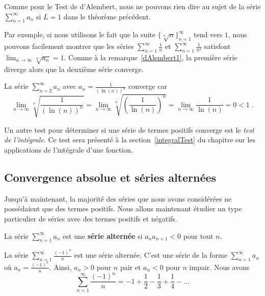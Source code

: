 {\begin{rmk}
Comme pour le Test de d'Alembert, nous ne pouvons rien dire au sujet
de la série
$\displaystyle \sum_{n=1}^\infty a_n$ si $L=1$ dans le théorème précédent. 

Par exemple, si nous utilisons le fait que la suite
$\{ \sqrt[n]{n} \}_{n=1}^\infty$ tend vers $1$, nous pouvons
facilement montrer que les séries
$\displaystyle \sum_{n=1}^\infty \frac{1}{n}$ et
$\displaystyle \sum_{n=1}^\infty \frac{1}{n^2}$ satisfont
$\displaystyle \lim_{n\rightarrow \infty} \sqrt[n]{a_n} = 1$.
Comme à la remarque~\ref{dAlembert1}, la première série diverge alors
que la deuxième série converge.
\end{rmk}

\begin{egg}
La série $\displaystyle \sum_{n=2}^\infty a_n$ avec
$\displaystyle a_n = \frac{1}{(\ln(n))^n}$ converge car
\[
\lim_{n\rightarrow \infty} \sqrt[n]{\frac{1}{(\ln(n))^n}} =
\lim_{n\rightarrow \infty} \sqrt[n]{\left(\frac{1}{\ln(n)}\right)^n} =
\lim_{n\rightarrow \infty} \frac{1}{\ln(n)} = 0 < 1 \; .
\]
\end{egg}

Un autre test pour déterminer si une série de termes positifs converge
est le {\em test de l'intégrale}.  Ce test sera présenté à la
section~\ref{integralTest} du chapitre sur les applications de
l'intégrale d'une fonction.

\subsection{Convergence absolue et séries alternées \eng}\label{serie_alt}

Jusqu'à maintenant, la majorité des séries que nous avons considérées
ne possédaient que des termes positifs.  Nous allons maintenant
étudier un type particulier de séries avec des termes positifs et
négatifs.

\begin{focus}{\dfn} 
La série $\displaystyle \sum_{n=1}^\infty a_n$ est une
{\bfseries série alternée} si $a_n a_{n+1} < 0$
pour tout $n$.
\end{focus}

\begin{egg}
La série $\displaystyle \sum_{n=1}^\infty \frac{(-1)^n}{n}$ est une
série alternée.  C'est une série de la forme
$\displaystyle \sum_{n=1}^\infty a_n$ où
$\displaystyle a_n = \frac{(-1)^n}{n}$.  Ainsi,
$a_n >0$ pour $n$ pair et $a_n <0$ pour $n$ impair.  Nous avons
\[
\sum_{n=1}^\infty \frac{(-1)^n}{n} = -1 + \frac{1}{2} - \frac{1}{3} +
\frac{1}{4} - \ldots
\]
\end{egg}

}
